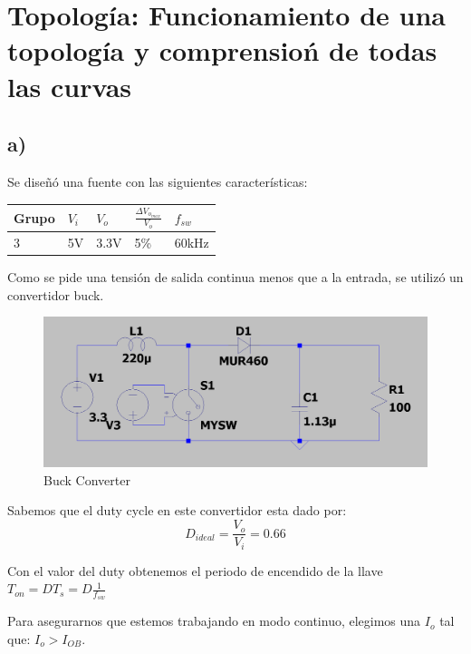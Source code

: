 \documentclass[e4_tp1_main.tex]{subfiles}
\begin{document}
\section{Topolog\'ia: Funcionamiento de una topolog\'ia y comprensio\'n de todas las curvas}

\subsection*{a)} 

Se diseñ\'o una fuente con las siguientes caracter\'isticas:

\begin{table}[H]
\centering
\begin{tabular}{|l|l|l|l|l|}
\hline
\multicolumn{1}{|c|}{Grupo}  & $V_{i}$ & $V_{o}$  & $\frac{\Delta V_{o_{max}}}{V_o}$ & $f_{sw}$ \\ \hline
3     						& 5V     & 3.3V  & 5\%   & 60kHz  \\ \hline
\end{tabular}
\label{tabla:datos de la fuente}
\end{table} 



Como se pide una tensi\'on de salida continua menos que a la entrada, se utiliz\'o un convertidor buck. 


\begin{figure}[H]
  \centering
    \includegraphics[scale = 1]{Imagenes/punto2/Circuito}
  \caption{Buck Converter}
  \label{Circuito}
\end{figure}




Sabemos que el duty cycle en este convertidor esta dado por: 
$$D_{ideal}=\frac{V_o}{V_i}=0.66$$

Con el valor del duty obtenemos el periodo de encendido de la llave $T_{on}=D T_s=D \frac{1}{f_{sw}}$


Para asegurarnos que estemos trabajando en modo continuo, elegimos una $I_{o}$ tal que: $I_{o}>I_{OB}$.
\end{document}

